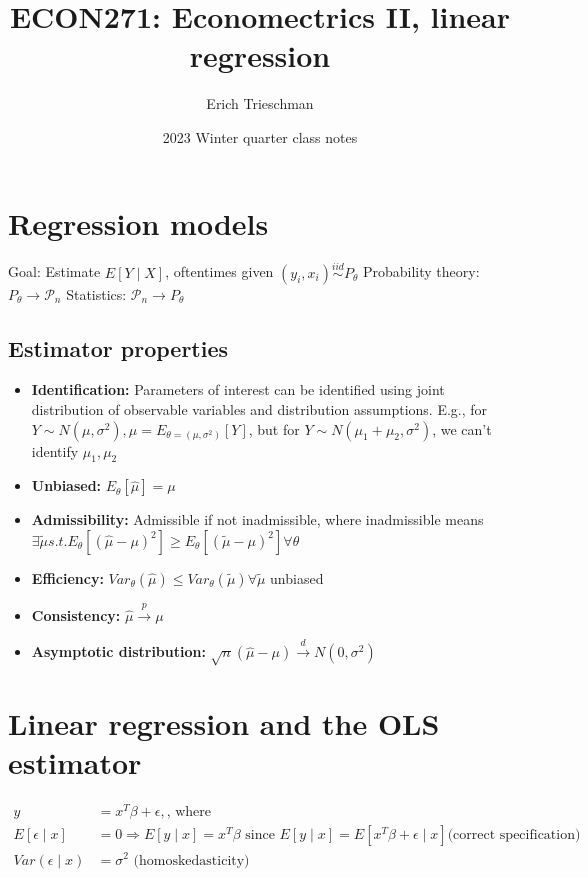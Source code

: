 \documentclass{article}
\title{ECON271: Economectrics II, linear regression}
\author{Erich Trieschman}
\date{2023 Winter quarter class notes}
\begin{document}
\maketitle

\tableofcontents

\section{Regression models}
Goal: Estimate $E[Y \mid X]$, oftentimes given $(y_i, x_i) \overset{iid}{\sim} P_\theta$
Probability theory: $P_\theta \rightarrow \mathcal{P}_n$
Statistics: $\mathcal{P}_n \rightarrow P_\theta$
\subsection{Estimator properties}
\begin{itemize}
  \item \textbf{Identification:} Parameters of interest can be identified using joint distribution of observable variables and distribution assumptions. E.g., for $Y \sim N(\mu, \sigma^2), \mu = E_{\theta = (\mu, \sigma^2)}[Y]$, but for $Y \sim N(\mu_1 + \mu_2, \sigma^2)$, we can't identify $\mu_1, \mu_2$
  \item \textbf{Unbiased:} $E_\theta[\hat{\mu}] = \mu$
  \item \textbf{Admissibility:} Admissible if not inadmissible, where inadmissible means $\exists \tilde{\mu} s.t. E_\theta[(\hat{\mu} - \mu)^2] \geq E_\theta[(\tilde{\mu} - \mu)^2] \forall \theta$
  \item \textbf{Efficiency:} $Var_\theta(\hat{\mu}) \leq Var_\theta(\tilde{\mu}) \forall \tilde{\mu}$ unbiased
  \item \textbf{Consistency:} $\hat{\mu} \overset{p}{\longrightarrow} \mu$
  \item \textbf{Asymptotic distribution:} $\sqrt{n}(\hat{\mu} - \mu) \overset{d}{\longrightarrow} N(0, \sigma^2)$
\end{itemize}

\section{Linear regression and the OLS estimator}
\begin{align*}
  y &= x^T\beta + \epsilon, \textrm{, where }\\
  E[\epsilon \mid x] &= 0 \Longrightarrow E[y \mid x] = x^T\beta \textrm{ since } E[y \mid x] = E[x^T\beta + \epsilon \mid x] \textrm{(correct specification)}\\
  Var(\epsilon \mid x) &= \sigma^2 \textrm{ (homoskedasticity)}
\end{align*}
\end{document}
